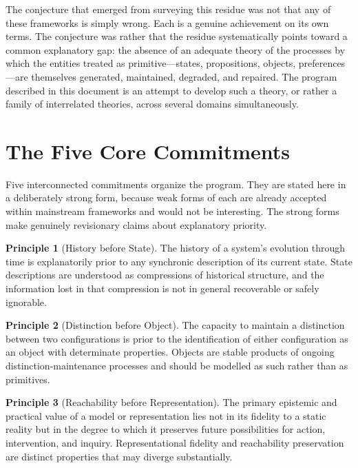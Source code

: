 \documentclass[11pt, oneside]{book}
\theoremstyle{definition}
\newtheorem{principle}{Principle}[chapter]
\theoremstyle{remark}
\begin{document}
The conjecture that emerged from surveying this residue was not that any of these frameworks is simply wrong. Each is a genuine achievement on its own terms. The conjecture was rather that the residue systematically points toward a common explanatory gap: the absence of an adequate theory of the processes by which the entities treated as primitive—states, propositions, objects, preferences—are themselves generated, maintained, degraded, and repaired. The program described in this document is an attempt to develop such a theory, or rather a family of interrelated theories, across several domains simultaneously.

\section{The Five Core Commitments}

Five interconnected commitments organize the program. They are stated here in a deliberately strong form, because weak forms of each are already accepted within mainstream frameworks and would not be interesting. The strong forms make genuinely revisionary claims about explanatory priority.

\begin{principle}[History before State]
The history of a system's evolution through time is explanatorily prior to any synchronic description of its current state. State descriptions are understood as compressions of historical structure, and the information lost in that compression is not in general recoverable or safely ignorable.
\end{principle}

\begin{principle}[Distinction before Object]
The capacity to maintain a distinction between two configurations is prior to the identification of either configuration as an object with determinate properties. Objects are stable products of ongoing distinction-maintenance processes and should be modelled as such rather than as primitives.
\end{principle}

\begin{principle}[Reachability before Representation]
The primary epistemic and practical value of a model or representation lies not in its fidelity to a static reality but in the degree to which it preserves future possibilities for action, intervention, and inquiry. Representational fidelity and reachability preservation are distinct properties that may diverge substantially.
\end{principle}
\end{document}
